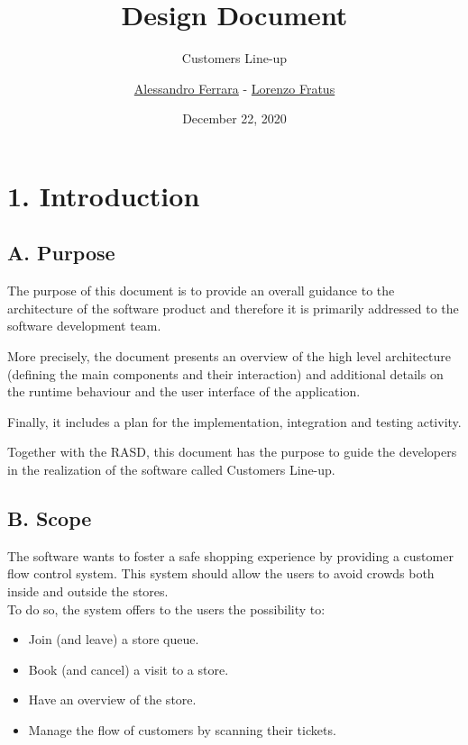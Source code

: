 
\graphicspath{ {assets/dd/} }

\title{Design Document}
\subtitle{Customers Line-up}
\author{\href{https://github.com/ferrohd}{Alessandro Ferrara} -
\href{https://github.com/lorenzofratus}{Lorenzo Fratus}}
\date{December 22, 2020}



\maketitle

\tableofcontents

\chapter{1. Introduction}

\section{A. Purpose}

The purpose of this document is to provide an overall guidance to the architecture of the software product and therefore it is primarily addressed to the software development team.

More precisely, the document presents an overview of the high level architecture (defining the main components and their interaction) and additional details on the runtime behaviour and the user interface of the application.

Finally, it includes a plan for the implementation, integration and testing activity.

Together with the RASD, this document has the purpose to guide the developers in the realization of the software called Customers Line-up.

\section{B. Scope}

The software wants to foster a safe shopping experience by providing a customer flow control system. This system should allow the users to avoid crowds both inside and outside the stores.\\
To do so, the system offers to the users the possibility to:

\begin{itemize}
    \item Join (and leave) a store queue.
    \item Book (and cancel) a visit to a store.
    \item Have an overview of the store.
    \item Manage the flow of customers by scanning their tickets.
\end{itemize}

